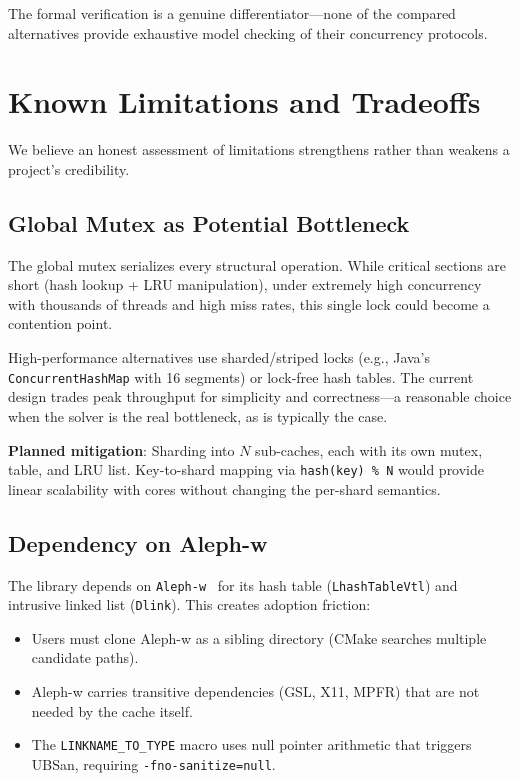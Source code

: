 \documentclass[11pt,a4paper]{article}
\begin{document}
The formal verification is a genuine differentiator---none of the
compared alternatives provide exhaustive model checking of their
concurrency protocols.

\section{Known Limitations and Tradeoffs}
\label{sec:limitations}

We believe an honest assessment of limitations strengthens rather than
weakens a project's credibility.

\subsection{Global Mutex as Potential Bottleneck}

The global mutex serializes every structural operation.  While critical
sections are short (hash lookup + LRU manipulation), under extremely
high concurrency with thousands of threads and high miss rates, this
single lock could become a contention point.

High-performance alternatives use sharded/striped locks (e.g., Java's
\texttt{ConcurrentHashMap} with 16 segments) or lock-free hash tables.
The current design trades peak throughput for simplicity and
correctness---a reasonable choice when the solver is the real bottleneck,
as is typically the case.

\textbf{Planned mitigation}: Sharding into $N$ sub-caches, each with
its own mutex, table, and LRU list.  Key-to-shard mapping via
\texttt{hash(key) \% N} would provide linear scalability with cores
without changing the per-shard semantics.

\subsection{Dependency on Aleph-w}

The library depends on \texttt{Aleph-w}~\cite{alephw} for its hash
table (\texttt{LhashTableVtl}) and intrusive linked list
(\texttt{Dlink}).  This creates adoption friction:

\begin{itemize}
\item Users must clone Aleph-w as a sibling directory (CMake searches
      multiple candidate paths).
\item Aleph-w carries transitive dependencies (GSL, X11, MPFR) that
      are not needed by the cache itself.
\item The \texttt{LINKNAME\_TO\_TYPE} macro uses null pointer arithmetic
      that triggers UBSan, requiring \texttt{-fno-sanitize=null}.
\end{itemize}
\end{document}
